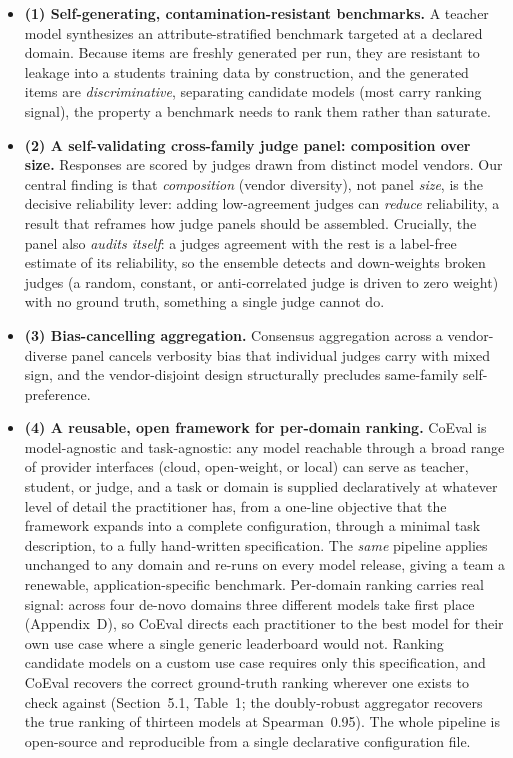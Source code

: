 \begin{itemize}
\tightlist
\item
  \textbf{(1) Self-generating, contamination-resistant benchmarks.} A teacher model synthesizes an
  attribute-stratified benchmark targeted at a declared domain. Because items are freshly generated per run, they
  are resistant to leakage into a student\textquotesingle s training data by construction, and the generated items are
  \emph{discriminative}, separating candidate models (most carry ranking signal), the property a benchmark needs to
  rank them rather than saturate.
\item
  \textbf{(2) A self-validating cross-family judge panel: composition over size.} Responses are scored by
  judges drawn from distinct model vendors. Our central finding is that \emph{composition} (vendor diversity), not
  panel \emph{size}, is the decisive reliability lever: adding low-agreement judges can \emph{reduce} reliability, a
  result that reframes how judge panels should be assembled. Crucially, the panel also \emph{audits itself}: a judge\textquotesingle s
  agreement with the rest is a label-free estimate of its reliability, so the ensemble detects and down-weights broken
  judges (a random, constant, or anti-correlated judge is driven to zero weight) with no ground truth, something a
  single judge cannot do.
\item
  \textbf{(3) Bias-cancelling aggregation.} Consensus aggregation across a vendor-diverse panel cancels
  verbosity bias that individual judges carry with mixed sign, and the vendor-disjoint design structurally precludes
  same-family self-preference.
\item
  \textbf{(4) A reusable, open framework for per-domain ranking.} CoEval is model-agnostic and
  task-agnostic: any model reachable through a broad range of provider interfaces (cloud, open-weight, or local) can
  serve as teacher, student, or judge, and a task or domain is supplied declaratively at whatever level of detail the
  practitioner has, from a one-line objective that the framework expands into a complete configuration, through a
  minimal task description, to a fully hand-written specification. The \emph{same} pipeline applies unchanged to any
  domain and re-runs on every model release, giving a team a renewable, application-specific
  benchmark. Per-domain ranking carries real signal: across four de-novo domains three different models take first
  place (Appendix~D), so CoEval directs each practitioner to the best model for their own use case where a
  single generic leaderboard would not. Ranking candidate models on a custom use case requires only this
  specification, and CoEval recovers the correct ground-truth ranking wherever one exists to check against
  (Section~5.1, Table~1; the doubly-robust aggregator recovers the true ranking of thirteen models at
  Spearman~0.95). The whole pipeline is open-source and reproducible from a single declarative
  configuration file.
\end{itemize}

